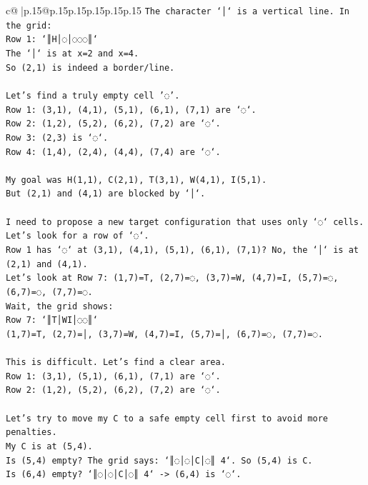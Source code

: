 \documentclass{article}
\begin{document}
{\begin{supertabular}{c@{$\;$}|p{.15\linewidth}@{}p{.15\linewidth}p{.15\linewidth}p{.15\linewidth}p{.15\linewidth}p{.15\linewidth}}
{{{\texttt{The character `│` is a vertical line. In the grid:} \\
\texttt{Row 1: `║H│◌│◌◌◌║`} \\
\texttt{The `│` is at x=2 and x=4.} \\
\texttt{So (2,1) is indeed a border/line.} \\
\\ 
\texttt{Let's find a truly empty cell '◌'.} \\
\texttt{Row 1: (3,1), (4,1), (5,1), (6,1), (7,1) are `◌`.} \\
\texttt{Row 2: (1,2), (5,2), (6,2), (7,2) are `◌`.} \\
\texttt{Row 3: (2,3) is `◌`.} \\
\texttt{Row 4: (1,4), (2,4), (4,4), (7,4) are `◌`.} \\
\\ 
\texttt{My goal was H(1,1), C(2,1), T(3,1), W(4,1), I(5,1).} \\
\texttt{But (2,1) and (4,1) are blocked by `│`.} \\
\\ 
\texttt{I need to propose a new target configuration that uses only `◌` cells.} \\
\texttt{Let's look for a row of `◌`.} \\
\texttt{Row 1 has `◌` at (3,1), (4,1), (5,1), (6,1), (7,1)? No, the `│` is at (2,1) and (4,1).} \\
\texttt{Let's look at Row 7: (1,7)=T, (2,7)=◌, (3,7)=W, (4,7)=I, (5,7)=◌, (6,7)=◌, (7,7)=◌.} \\
\texttt{Wait, the grid shows:} \\
\texttt{Row 7: `║T│WI│◌◌║`} \\
\texttt{(1,7)=T, (2,7)=│, (3,7)=W, (4,7)=I, (5,7)=│, (6,7)=◌, (7,7)=◌.} \\
\\ 
\texttt{This is difficult. Let's find a clear area.} \\
\texttt{Row 1: (3,1), (5,1), (6,1), (7,1) are `◌`.} \\
\texttt{Row 2: (1,2), (5,2), (6,2), (7,2) are `◌`.} \\
\\ 
\texttt{Let's try to move my C to a safe empty cell first to avoid more penalties.} \\
\texttt{My C is at (5,4).} \\
\texttt{Is (5,4) empty? The grid says: `║◌│◌│C│◌║ 4`. So (5,4) is C.} \\
\texttt{Is (6,4) empty? `║◌│◌│C│◌║ 4` {-}> (6,4) is `◌`.} \\
}}}
\end{supertabular}}
\end{document}
